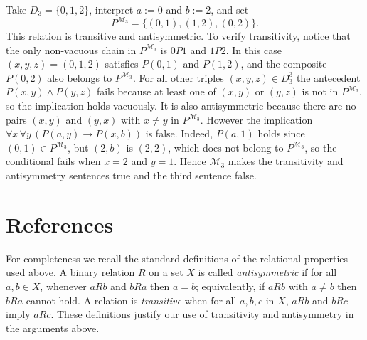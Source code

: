 \documentclass[12pt]{article}
\begin{document}
Take $D_3=\{0,1,2\}$, interpret $a:=0$ and $b:=2$, and set
\[
P^{\mathcal{M}_3} = \{(0,1),(1,2),(0,2)\}.
\]
This relation is transitive and antisymmetric.  To verify transitivity, notice that the only non-vacuous chain in $P^{\mathcal{M}_3}$ is $0P1$ and $1P2$.  In this case $(x,y,z)=(0,1,2)$ satisfies $P(0,1)$ and $P(1,2)$, and the composite $P(0,2)$ also belongs to $P^{\mathcal{M}_3}$.  For all other triples $(x,y,z)\in D_3^3$ the antecedent $P(x,y)\wedge P(y,z)$ fails because at least one of $(x,y)$ or $(y,z)$ is not in $P^{\mathcal{M}_3}$, so the implication holds vacuously.  It is also antisymmetric because there are no pairs $(x,y)$ and $(y,x)$ with $x\neq y$ in $P^{\mathcal{M}_3}$.  However the implication $\forall x\,\forall y\,(P(a,y)\to P(x,b))$ is false.  Indeed, $P(a,1)$ holds since $(0,1)\in P^{\mathcal{M}_3}$, but $(2,b)$ is $(2,2)$, which does not belong to $P^{\mathcal{M}_3}$, so the conditional fails when $x=2$ and $y=1$.  Hence $\mathcal{M}_3$ makes the transitivity and antisymmetry sentences true and the third sentence false.

\section*{References}

For completeness we recall the standard definitions of the relational properties used above.  A binary relation $R$ on a set $X$ is called \emph{antisymmetric} if for all $a,b\in X$, whenever $aRb$ and $bRa$ then $a=b$; equivalently, if $aRb$ with $a\neq b$ then $bRa$ cannot hold.  A relation is \emph{transitive} when for all $a,b,c$ in $X$, $aRb$ and $bRc$ imply $aRc$.  These definitions justify our use of transitivity and antisymmetry in the arguments above.
\end{document}

